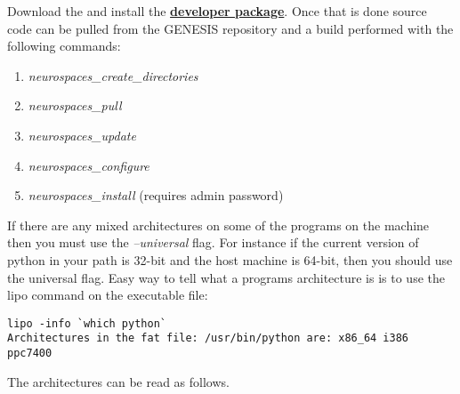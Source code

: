 \documentclass[12pt]{article}
\begin{document}

Download the and install the \href{../../developer-package/developer-package.tex}{\bf developer package}. Once that is done source code can be pulled from the GENESIS repository and a build performed with the following commands:
\begin{enumerate}
   \item{\it neurospaces\_create\_directories}
   \item{\it neurospaces\_pull}
   \item{\it neurospaces\_update}
   \item{\it neurospaces\_configure}
   \item{\it neurospaces\_install} (requires admin password) 
\end{enumerate}

If there are any mixed architectures on some of the programs on the machine then you must use the {\it --universal} flag. For instance if the current version of python in your path is 32-bit and the host machine is 64-bit, then you should use the universal flag. Easy way to tell what a programs architecture is is to use the lipo command on the executable file:

\begin{verbatim}
lipo -info `which python`
Architectures in the fat file: /usr/bin/python are: x86_64 i386 ppc7400
\end{verbatim}

The architectures can be read as follows.
\end{document}
